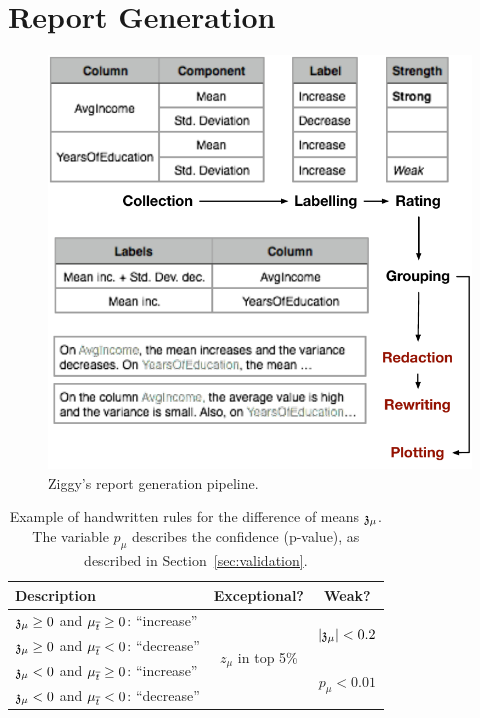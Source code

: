 \section{Report Generation}
\label{sec:reporting}
\begin{figure}[t!]
  \centering
  \includegraphics[width=\columnwidth]{Figures/ReportGeneration}
  \caption{Ziggy's report generation pipeline.}
  \label{pic:reportpipeline}
\end{figure}
\begin{table}[t!]
    \centering
    \begin{tabular}{| p{4.2cm} | c | c |}
      \hline
      Description & Exceptional? & Weak?\\
      \hline
      $\mathfrak{z_\mu} \geq 0$ and $\mu_{\overline{t}} \geq 0$: ``increase'' &
          \multirow{4}{*}{$z_\mu$ in top 5\%} & 
            \multirow{2}{*}{$|\mathfrak{z_\mu}| < 0.2$}\\
      $\mathfrak{z_\mu} \geq 0$ and $\mu_{\overline{t}} < 0$: ``decrease'' &
      &\\
      $\mathfrak{z_\mu} < 0$ and $\mu_{\overline{t}} \geq0$: ``increase'' &
       &\multirow{2}{*}{$p_\mu < 0.01$}\\
      $\mathfrak{z_\mu} < 0$ and $\mu_{\overline{t}} < 0$: ``decrease'' &
      &\\
      \hline
    \end{tabular}
    \caption{Example of handwritten rules for the difference of means
    $\mathfrak{z_\mu}$. The variable $p_\mu$ describes the confidence (p-value), as
described in Section~\ref{sec:validation}.} 
\label{tab:handwritten}
\end{table}

